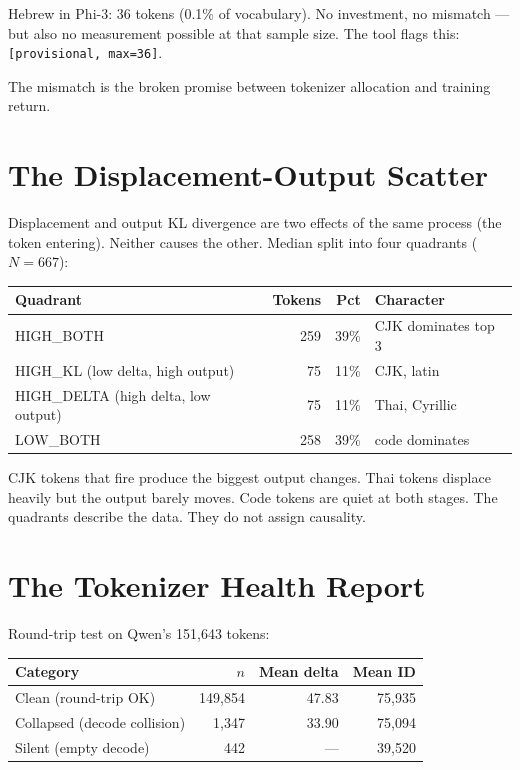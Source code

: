 \documentclass[11pt,a4paper]{article}
\begin{document}
Hebrew in Phi-3: 36 tokens (0.1\% of vocabulary). No investment, no mismatch --- but also no measurement possible at that sample size. The tool flags this: \texttt{[provisional, max=36]}.

The mismatch is the broken promise between tokenizer allocation and training return.

\section{The Displacement-Output Scatter}

Displacement and output KL divergence are two effects of the same process (the token entering). Neither causes the other. Median split into four quadrants ($N = 667$):

\begin{center}
\begin{tabular}{lrrl}
\toprule
\textbf{Quadrant} & \textbf{Tokens} & \textbf{Pct} & \textbf{Character} \\
\midrule
HIGH\_BOTH & 259 & 39\% & CJK dominates top 3 \\
HIGH\_KL (low delta, high output) & 75 & 11\% & CJK, latin \\
HIGH\_DELTA (high delta, low output) & 75 & 11\% & Thai, Cyrillic \\
LOW\_BOTH & 258 & 39\% & code dominates \\
\bottomrule
\end{tabular}
\end{center}

CJK tokens that fire produce the biggest output changes. Thai tokens displace heavily but the output barely moves. Code tokens are quiet at both stages. The quadrants describe the data. They do not assign causality.

\section{The Tokenizer Health Report}

Round-trip test on Qwen's 151,643 tokens:

\begin{center}
\begin{tabular}{lrrr}
\toprule
\textbf{Category} & \textbf{$n$} & \textbf{Mean delta} & \textbf{Mean ID} \\
\midrule
Clean (round-trip OK) & 149,854 & 47.83 & 75,935 \\
Collapsed (decode collision) & 1,347 & 33.90 & 75,094 \\
Silent (empty decode) & 442 & --- & 39,520 \\
\bottomrule
\end{tabular}
\end{center}
\end{document}
